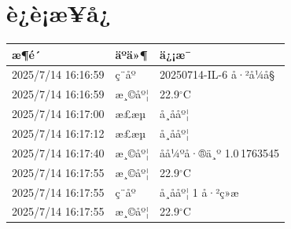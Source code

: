 \documentclass[UTF8,10pt,a4paper,fontset=fandol]{ctexart}
\newcommand{\fieldvalue}[1]{#1}
\begin{document}
\section*{è¿è¡æ¥å¿}

\begin{tabularx}{\textwidth}{l l X}
æ¶é´ & äºä»¶ & ä¿¡æ¯\\
\hline
\fieldvalue{2025/7/14 16:16:59} &
ç¨åº &
\fieldvalue{20250714-IL-6 å·²å¼å§}\\
\fieldvalue{2025/7/14 16:16:59} &
æ¸©åº¦ &
\fieldvalue{22.9$^\circ$C}\\
\fieldvalue{2025/7/14 16:17:00} &
æ£æµ &
\fieldvalue{å¸ååº¦}\\
\fieldvalue{2025/7/14 16:17:12} &
æ£æµ &
\fieldvalue{å¸ååº¦}\\
\fieldvalue{2025/7/14 16:17:40} &
æ¸©åº¦ &
\fieldvalue{åå¼ºå·®ä¸º 1.0\,1763545}\\
\fieldvalue{2025/7/14 16:17:55} &
æ¸©åº¦ &
\fieldvalue{22.9$^\circ$C}\\
\fieldvalue{2025/7/14 16:17:55} &
ç¨åº &
\fieldvalue{å¸ååº¦ 1 å·²ç»æ}\\
\fieldvalue{2025/7/14 16:17:55} &
æ¸©åº¦ &
\fieldvalue{22.9$^\circ$C}
\end{tabularx}


\newpage
\end{document}
